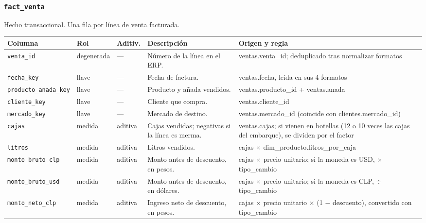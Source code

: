 
\subsubsection*{\texttt{fact\_venta}}
Hecho transaccional. Una fila por línea de venta facturada.

{\footnotesize
\begin{longtable}{@{}>{\raggedright\arraybackslash}p{}>{\raggedright\arraybackslash}p{}>{\raggedright\arraybackslash}p{}>{\raggedright\arraybackslash}p{}>{\raggedright\arraybackslash}p{}@{}}
\toprule
Columna & Rol & Aditiv. & Descripción & Origen y regla \\
\midrule
\endhead
\texttt{venta\_id} & degenerada & — & Número de la línea en el ERP. & ventas.\allowbreak{}venta\_id; deduplicado tras normalizar formatos \\
\texttt{fecha\_key} & llave & — & Fecha de factura. & ventas.\allowbreak{}fecha, leída en sus 4 formatos \\
\texttt{producto\_anada\_key} & llave & — & Producto y añada vendidos. & ventas.\allowbreak{}producto\_id + ventas.\allowbreak{}anada \\
\texttt{cliente\_key} & llave & — & Cliente que compra. & ventas.\allowbreak{}cliente\_id \\
\texttt{mercado\_key} & llave & — & Mercado de destino. & ventas.\allowbreak{}mercado\_id (coincide con clientes.\allowbreak{}mercado\_id) \\
\texttt{cajas} & medida & aditiva & Cajas vendidas; negativas si la línea es merma. & ventas.\allowbreak{}cajas; si vienen en botellas (12 o 10 veces las cajas del embarque), se dividen por el factor \\
\texttt{litros} & medida & aditiva & Litros vendidos. & cajas $\times$ dim\_producto.\allowbreak{}litros\_por\_caja \\
\texttt{monto\_bruto\_clp} & medida & aditiva & Monto antes de descuento, en pesos. & cajas $\times$ precio unitario; si la moneda es USD, $\times$ tipo\_cambio \\
\texttt{monto\_bruto\_usd} & medida & aditiva & Monto antes de descuento, en dólares. & cajas $\times$ precio unitario; si la moneda es CLP, $\div$ tipo\_cambio \\
\texttt{monto\_neto\_clp} & medida & aditiva & Ingreso neto de descuento, en pesos. & cajas $\times$ precio unitario $\times$ (1 $-$ descuento), convertido con tipo\_cambio \\

\end{longtable}}
